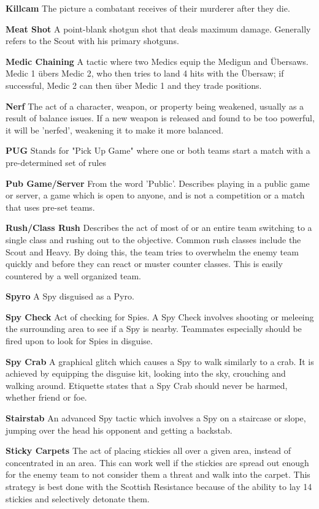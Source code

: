 {\bf Killcam} The picture a combatant receives of their murderer after they die.
 
{\bf Meat Shot} A point-blank shotgun shot that deals maximum damage. Generally refers to the Scout with his primary shotguns.

\newpage

{\bf Medic Chaining} A tactic where two Medics equip the Medigun and Übersaws. Medic 1 übers Medic 2, who then tries to land 4 hits with the Übersaw; if successful, Medic 2 can then über Medic 1 and they trade positions.

{\bf Nerf} The act of a character, weapon, or property being weakened, usually as a result of balance issues. If a new weapon is released and found to be too powerful, it will be 'nerfed', weakening it to make it more balanced.

{\bf PUG} Stands for "Pick Up Game" where one or both teams start a match with a pre-determined set of rules

{\bf Pub Game/Server} From the word 'Public'. Describes playing in a public game or server, a game which is open to anyone, and is not a competition or a match that uses pre-set teams.

{\bf Rush/Class Rush} Describes the act of most of or an entire team switching to a single class and rushing out to the objective. Common rush classes include the Scout and Heavy. By doing this, the team tries to overwhelm the enemy team quickly and before they can react or muster counter classes. This is easily countered by a well organized team.

{\bf Spyro} A Spy disguised as a Pyro.

{\bf Spy Check} Act of checking for Spies. A Spy Check involves shooting or meleeing the surrounding area to see if a Spy is nearby.  Teammates especially should be fired upon to look for Spies in disguise.

{\bf Spy Crab} A graphical glitch which causes a Spy to walk similarly to a crab. It is achieved by equipping the disguise kit, looking into the sky, crouching and walking around. Etiquette states that a Spy Crab should never be harmed, whether friend or foe.

{\bf Stairstab} An advanced Spy tactic which involves a Spy on a staircase or slope, jumping over the head his opponent and getting a backstab.

{\bf Sticky Carpets} The act of placing stickies all over a given area, instead of concentrated in an area. This can work well if the stickies are spread out enough for the enemy team to not consider them a threat and walk into the carpet. This strategy is best done with the Scottish Resistance because of the ability to lay 14 stickies and selectively detonate them.

